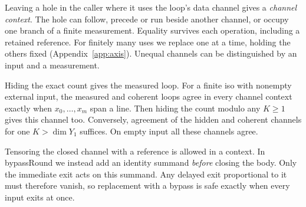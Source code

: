 \documentclass[acmsmall,screen,review,anonymous,nonacm]{acmart}
\newcommand{\storyinlineface}{\small\ttfamily}
\newcommand{\code}[1]{\textnormal{\storyinlineface #1}}
\newcommand{\ket}[1]{\lvert #1\rangle}
\numberwithin{equation}{section}
\begin{document}
Leaving a hole in the caller where it uses the loop's data channel gives a \emph{channel context}. The hole can follow, precede or run beside another channel, or occupy one branch of a finite measurement. Equality survives each operation, including a retained reference. For finitely many uses we replace one at a time, holding the others fixed (Appendix~\ref{app:axis}). Unequal channels can be distinguished by an input and a measurement.

\begin{corollary}\label{cor:replace}
Hiding the exact count gives the measured loop. For a finite iso with nonempty external input, the measured and coherent loops agree in every channel context exactly when $x_0,\ldots,x_m$ span a line. Then hiding the count modulo any $K\ge1$ gives this channel too. Conversely, agreement of the hidden and coherent channels for one $K>\dim Y_1$ suffices. On empty input all these channels agree.
\end{corollary}
Tensoring the closed channel with a reference is allowed in a context. In
\code{bypassRound} we instead add an identity summand \emph{before} closing the body. Only
the immediate exit acts on this summand. Any delayed exit proportional to it must
therefore vanish, so replacement with a bypass is safe exactly when every input exits at
once.
\newcommand{\phaseReadout}[1]{
\begin{tikzpicture}[kme circuit,x=#1,y=#1,>={Stealth[length=1.3mm,width=.9mm]},
port/.style={draw=flipout,line width=.8pt},
ret/.style={draw=flipback,line width=.8pt}]
 \node[kme gate,minimum width=.85cm,minimum height=.83cm] (u) at
 (3.30,2.30) {$U$};
 \draw[port,->] (.30,2.55) node[left] {$X$} -- (u.west |- 0,2.55);
 \draw[port,->] (u.east |- 0,2.55) -- (6.85,2.55) node[right] {$X'$};
 \draw[ret] (u.east |- 0,2.05) -- (5.25,2.05)
.. controls (5.90,2.05) and (5.90,0.95) .. (5.25,0.95) -- (1.10,0.95)
.. controls (.45,0.95) and (.45,2.05) .. (1.10,2.05) -- (u.west |-
0,2.05);
 \draw[ret,->] (1.45,2.05) -- (1.90,2.05);
 \draw[ret,->] (4.80,0.95) -- (4.40,0.95);
 \node[kme gate,draw=flipback,text=flipback] at (1.90,0.95) {$zI_Y$};
 \node[kme gate,draw=flipback,text=flipback,inner xsep=3pt] (p) at (3.40,0.95)
 {$e^{i\delta}I_Y$};
 \node[text=flipback] at (6.05,1.45) {$Y$};
 \draw[kme wire] (.30,0) node[left,align=center] {probe\\$\ket0_r$} -- (6.35,0);
 \node[kme gate] at (.95,0) {$H$};
 \node[kme dot] (r) at (3.40,0) {};
 \draw[kme wire] (r) -- (p.south);
 \node[kme gate,minimum width=4.8mm] at (4.50,0) {$S^\dagger$};
 \node[kme gate,minimum width=4.8mm] at (5.64,0) {$H$};
 \node[kme gate,minimum width=5.2mm,draw=accentwarm,text=accentwarm] (m) at (6.80,0)
 {$M_Z$};
 \draw[accentwarm,double,double distance=.65pt,->] (m.east) --
 (7.75,0) node[right] {$b$};
\end{tikzpicture}}
\end{document}
